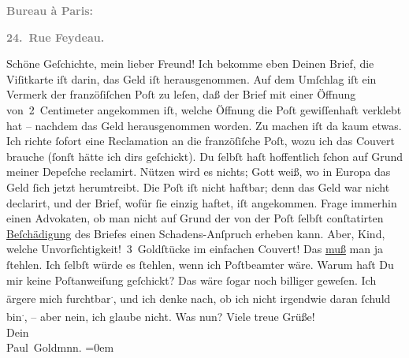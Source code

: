 \begin{ledgroupsized}[t]{13cm}
           \pstart
           \begin{otherlanguage}{french}\textcolor{gray}{\textbf{\textbf{Bureau à Paris:}}}\end{otherlanguage}\pend
           \pstart
           \begin{otherlanguage}{french}\textcolor{gray}{\textbf{\textbf{24. Rue Feydeau.}}}\end{otherlanguage}\pend
           {\bigskip}\pstart
           Schöne Geſchichte, mein lieber Freund! Ich bekomme
               eben Deinen Brief, die Viſitkarte iſt darin, das Geld iſt herausgenommen. Auf dem
               Umſchlag iſt ein Vermerk der franzöſiſchen Poſt
               zu leſen, daß der Brief mit einer Öffnung von 2 Centimeter angekommen iſt, welche
               Öffnung die Poſt gewiſſenhaft  verklebt hat – nachdem das Geld herausgenommen
               worden. Zu machen iſt da kaum etwas. Ich richte ſofort eine Reclamation an die franzöſiſche Poſt, wozu ich das Couvert brauche
               (ſonſt hätte ich dirs geſchickt). {\pb}Du ſelbſt haſt
               hoffentlich ſchon auf Grund meiner Depeſche reclamirt. Nützen wird es nichts; Gott
               weiß, wo in Europa das Geld ſich jetzt
               herumtreibt. Die Poſt iſt nicht haftbar; denn das
               Geld war nicht declarirt, und der Brief, wofür ſie einzig haftet, iſt angekommen.
               Frage immerhin einen Advokaten, ob man nicht auf Grund der von der Poſt ſelbſt conſtatirten \uline{Beſchädigung} des Briefes einen Schadens-Anſpruch erheben kann. {\pb}Aber, Kind, welche Unvorſichtigkeit! 3 Goldſtücke im
               einfachen Couvert! Das \uline{muß} man ja ſtehlen. Ich ſelbſt
               würde es ſtehlen, wenn ich Poſtbeamter wäre. Warum haſt Du mir keine Poſtanweiſung
               geſchickt? Das wäre ſogar noch billiger geweſen.\pend
           \pstart
           Ich ärgere mich furchtbar\substVorne{}\textsuperscript{.}\substDazwischen{},\substHinten{} und ich denke nach, ob ich nicht irgendwie daran ſchuld bin\substVorne{}\textsuperscript{.}\substDazwischen{},\substHinten{} – aber nein, ich glaube nicht.\pend
           \pstart
           {\pb}Was nun?\pend
           \pstart
           Viele treue Grüße! {\\[\baselineskip]}Dein{\\[\baselineskip]}\spacefill\mbox{Paul Goldmnn.}\pend
           \leftskip=0em{}
         
         \endnumbering{}\end{ledgroupsized}  \newcommand{\dateiname}{L02760}\newcommand{\titel}{Paul Goldmann an Arthur Schnitzler, 21. 12. [1895]}\newcommand{\editorInnen}{Martin Anton Müller und Laura Untner}
      